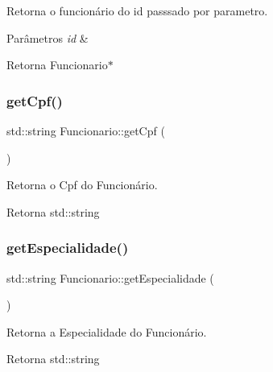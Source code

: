 Retorna o funcionário do id passsado por parametro. 


\begin{DoxyParams}{Parâmetros}
{\em id} & \\
\hline
\end{DoxyParams}
\begin{DoxyReturn}{Retorna}
Funcionario$\ast$ 
\end{DoxyReturn}
\mbox{\label{classFuncionario_aad99a1c5373c00bf5ad161aad1b18a4f}} 
\subsubsection{\texorpdfstring{get\+Cpf()}{getCpf()}}
{\footnotesize\ttfamily std\+::string Funcionario\+::get\+Cpf (\begin{DoxyParamCaption}{ }\end{DoxyParamCaption})}



Retorna o Cpf do Funcionário. 

\begin{DoxyReturn}{Retorna}
std\+::string 
\end{DoxyReturn}
\mbox{\label{classFuncionario_a98b261893ff916049db28530d3ba1160}} 
\subsubsection{\texorpdfstring{get\+Especialidade()}{getEspecialidade()}}
{\footnotesize\ttfamily std\+::string Funcionario\+::get\+Especialidade (\begin{DoxyParamCaption}{ }\end{DoxyParamCaption})}



Retorna a Especialidade do Funcionário. 

\begin{DoxyReturn}{Retorna}
std\+::string 
\end{DoxyReturn}
\mbox{\label{classFuncionario_a87dc4304683c4a4492a5ecd516d29f44}} 
